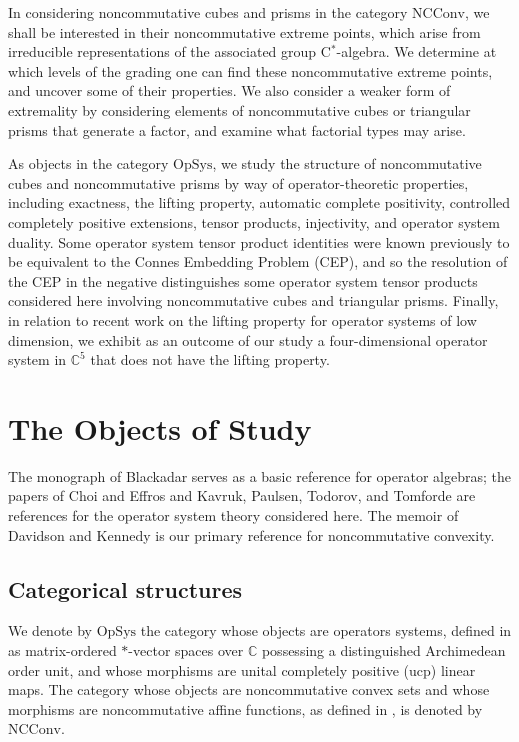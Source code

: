 \documentclass{amsart}
\theoremstyle{definition}
\theoremstyle{remark}
\numberwithin{equation}{section}
\begin{document}
In considering noncommutative cubes and prisms in the category ${\textrm{NCConv}}$, we shall be interested in their noncommutative extreme points, which arise from irreducible representations of the associated group C$^*$-algebra. We determine at which levels of the grading one can find these noncommutative extreme points, and uncover some of their properties. We also consider a weaker form of extremality by considering elements of noncommutative cubes or triangular prisms that generate a factor, and examine what factorial types may arise.

As objects in the category ${\textrm{OpSys}}$, we study the structure of noncommutative cubes and noncommutative
prisms by way of operator-theoretic properties, including exactness, the lifting property, 
automatic complete positivity, controlled completely positive extensions, tensor products, injectivity, and operator system duality. Some operator system tensor product identities were known previously to be equivalent to the Connes Embedding Problem (CEP), and so the resolution of the CEP in the negative distinguishes some operator system tensor products considered here involving noncommutative cubes and triangular prisms. 
Finally, in relation to recent work  \cite{harris2025,scherer2026} on the lifting property for operator systems of low dimension, 
we exhibit as an outcome of our study a four-dimensional operator system in $\mathbb C^5$ that does not have the lifting property. 
 
\section{The Objects of Study}

The monograph of Blackadar \cite{Blackadar-book} serves as a basic reference for operator algebras; the papers of Choi and Effros \cite{choi--effros1977} and Kavruk, Paulsen, Todorov, and Tomforde \cite{kavruk--paulsen--todorov--tomforde2011,kavruk--paulsen--todorov--tomforde2013} are references for the operator system theory considered here. The memoir of Davidson and Kennedy \cite{davidson--kennedy2019}
is our primary reference for noncommutative convexity.

\subsection{Categorical structures}

We denote by ${\textrm{OpSys}}$ the category whose objects are operators systems, defined in \cite{choi--effros1977}
as matrix-ordered $*$-vector spaces over $\mathbb C$ possessing a distinguished Archimedean order unit, and whose morphisms are unital completely positive (ucp) linear maps. The category whose objects are noncommutative convex sets and whose morphisms are noncommutative affine functions, as defined in  \cite{davidson--kennedy2019}, is denoted by ${\textrm{NCConv}}$.
\end{document}
